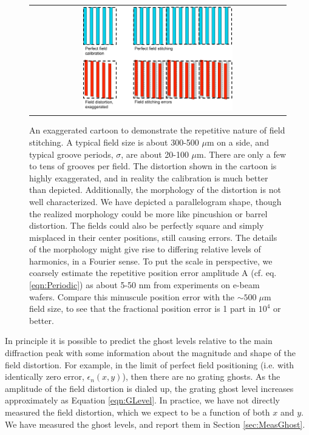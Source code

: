 \documentclass[]{spie}  %
\begin{document}
\begin{figure}
\begin{center}
 \begin{tabular}{c}
    \includegraphics[width=0.6\textwidth]{figs/Field_stitching_errors.pdf}
   \end{tabular}
  \end{center}
  \caption[Field Stitching Error Cartoon]{\label{fig:FieldCartoon} An exaggerated cartoon to demonstrate the repetitive nature of field stitching.  A typical field size is about 300-500 $\mu$m on a side, and typical groove periods, $\sigma$, are about 20-100 $\mu$m.  There are only a few to tens of grooves per field.  The distortion shown in the cartoon is highly exaggerated, and in reality the calibration is much better than depicted.  Additionally, the morphology of the distortion is not well characterized.  We have depicted a parallelogram shape, though the realized morphology could be more like pincushion or barrel distortion.  The fields could also be perfectly square and simply misplaced in their center positions, still causing errors.  The details of the morphology might give rise to differing relative levels of harmonics, in a Fourier sense.  To put the scale in perspective, we coarsely estimate the repetitive position error amplitude A (cf. eq. \ref{eqn:Periodic}) as about 5-50 nm from experiments on e-beam wafers.  Compare this minuscule position error with the $\sim500 \; \mu$m field size, to see that the fractional position error is 1 part in $10^4$ or better.}
\end{figure}

In principle it is possible to predict the ghost levels relative to the main diffraction peak with some information about the magnitude and shape of the field distortion.  For example, in the limit of perfect field positioning (i.e. with identically zero error, $\epsilon_n(x,y)$), then there are no grating ghosts.  As the amplitude of the field distortion is dialed up, the grating ghost level increases approximately as Equation \ref{eqn:GLevel}.  In practice, we have not directly measured the field distortion, which we expect to be a function of both $x $ and $y$.  We have measured the ghost levels, and report them in Section \ref{sec:MeasGhost}.
\end{document}
